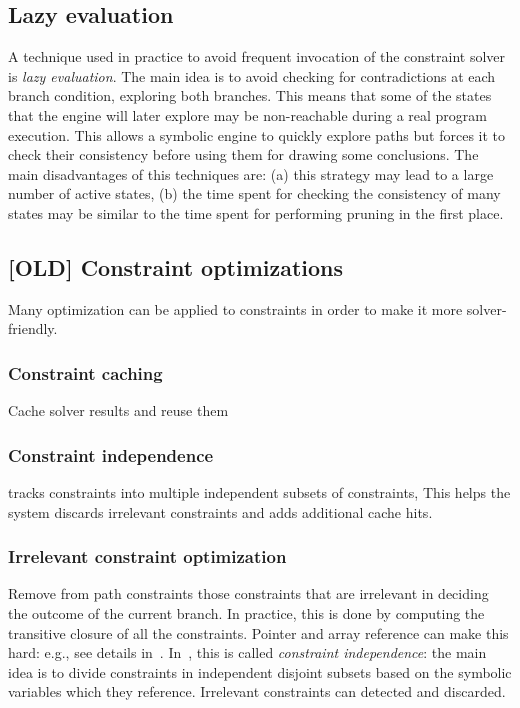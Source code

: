 \subsection{Lazy evaluation}
 A technique used in practice to avoid frequent invocation of the constraint solver is {\em lazy evaluation}. The main idea is to avoid checking for contradictions at each branch condition, exploring both branches. This means that some of the states that the engine will later explore may be non-reachable during a real program execution. This allows a symbolic engine to quickly explore paths but forces it to check their consistency before using them for drawing some conclusions. The main disadvantages of this techniques are: (a) this strategy may lead to a large number of active states, (b) the time spent for checking the consistency of many states may be similar to the time spent for performing pruning in the first place.
\fi

\subsection{[OLD] Constraint optimizations}
\label{constraint-optimizations}


Many optimization can be applied to constraints in order to make it more solver-friendly.

\iffalse

\subsubsection{Constraint caching} Cache solver results and reuse them 

\subsubsection{Constraint independence} tracks constraints into multiple independent subsets of constraints, This helps the system discards irrelevant constraints and adds additional cache hits.  

\subsubsection{Irrelevant constraint optimization} Remove from path constraints those constraints that are irrelevant in deciding the outcome of the current branch. In practice, this is done by computing the transitive closure of all the constraints. Pointer and array reference can make this hard: e.g., see details in~\cite{EXE-CCS06,EGL-ISSTA09,CUTE-FSE13}. In~\cite{KLEE-OSDI08}, this is called {\em constraint independence}: the main idea is to divide constraints in independent disjoint subsets based on the symbolic variables which they reference. Irrelevant constraints can detected and discarded.

